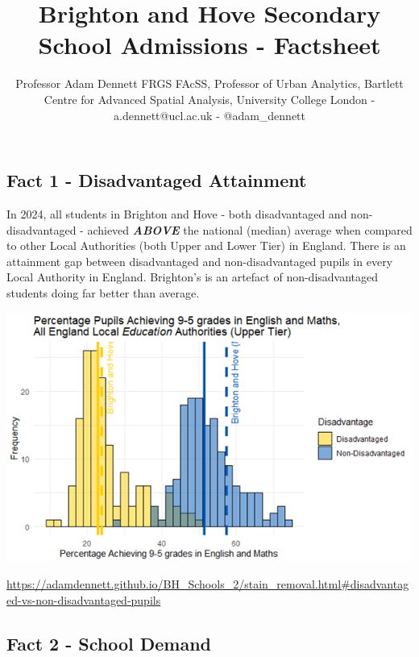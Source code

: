 \documentclass[
  letterpaper,
  DIV=11,
  numbers=noendperiod]{scrartcl}
\title{Brighton and Hove Secondary School Admissions - Factsheet}
\author{Professor Adam Dennett FRGS FAcSS, Professor of Urban Analytics,
Bartlett Centre for Advanced Spatial Analysis, University College London
- a.dennett@ucl.ac.uk - @adam\_dennett}
\date{}
\begin{document}
\maketitle
\ifdefined\Shaded\renewenvironment{Shaded}{\begin{tcolorbox}[sharp corners, enhanced, borderline west={3pt}{0pt}{shadecolor}, interior hidden, frame hidden, boxrule=0pt, breakable]}{\end{tcolorbox}}\fi

\hypertarget{fact-1---disadvantaged-attainment}{%
\subsection{Fact 1 - Disadvantaged
Attainment}\label{fact-1---disadvantaged-attainment}}

In 2024, all students in Brighton and Hove - both disadvantaged and
non-disadvantaged - achieved \textbf{\emph{ABOVE}} the national (median)
average when compared to other Local Authorities (both Upper and Lower
Tier) in England. There is an attainment gap between disadvantaged and
non-disadvantaged pupils in every Local Authority in England. Brighton's
is an artefact of non-disadvantaged students doing far better than
average.

\includegraphics{images/attainmentgap_95.png}

\url{https://adamdennett.github.io/BH_Schools_2/stain_removal.html\#disadvantaged-vs-non-disadvantaged-pupils}

\hypertarget{fact-2---school-demand}{%
\subsection{Fact 2 - School Demand}\label{fact-2---school-demand}}
\end{document}
